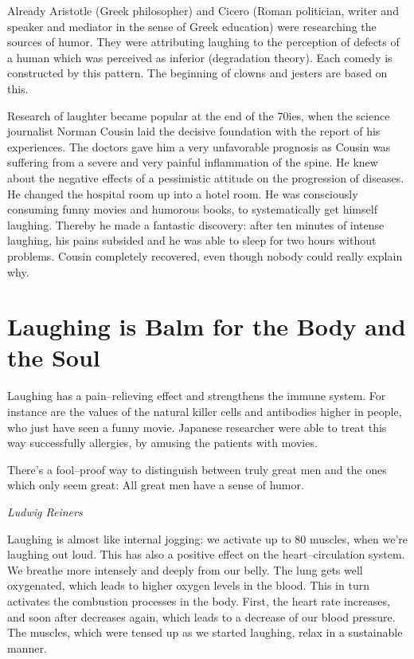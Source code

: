 \documentclass[../Book.Stress_regulation.tex]{subfiles}
\begin{document}
Already Aristotle (Greek philosopher) and Cicero
(Roman politician, writer and speaker and mediator in the sense of Greek education) were researching the sources of humor.
They were attributing laughing to the perception of defects of a human which was perceived as inferior (degradation theory).
Each comedy is constructed by this pattern.
The beginning of clowns and jesters are based on this.

Research of laughter became popular at the end of the 70ies, when the science journalist Norman Cousin laid the decisive foundation with the report of his experiences.
The doctors gave him a very unfavorable prognosis as Cousin was suffering from a severe and very painful inflammation of the spine.
He  knew about the negative effects of a pessimistic attitude on the progression of diseases.
He changed the hospital room up into a hotel room.
He was consciously consuming funny movies and humorous books, to systematically get himself laughing.
Thereby he made a fantastic discovery: after ten minutes of intense laughing, his pains subsided and he was able to sleep for two hours without problems.
Cousin completely recovered, even though nobody could really explain why.

\section{Laughing is Balm for the Body and the Soul}

Laughing has a pain--relieving effect and strengthens the immune system.
For instance are the values of the natural killer cells and antibodies higher in people, who just have seen a funny movie.
Japanese researcher were able to treat this way successfully allergies, by amusing the patients with movies.

\epigraph{There's a fool--proof way to distinguish between truly great men and the ones which only seem great: All great men have a sense of humor.}{\textit{Ludwig Reiners}}

Laughing is almost like internal jogging: we activate up to 80 muscles, when we're laughing out loud.
This has also a positive effect on the heart--circulation system.
We breathe more intensely and deeply from our belly.
The lung gets well oxygenated, which leads to higher oxygen levels in the blood.
This in turn activates the combustion processes in the body.
First, the heart rate increases, and soon after decreases again, which leads to a decrease of our blood pressure.
The muscles, which were tensed up as we started laughing, relax in a sustainable manner.
\end{document}
